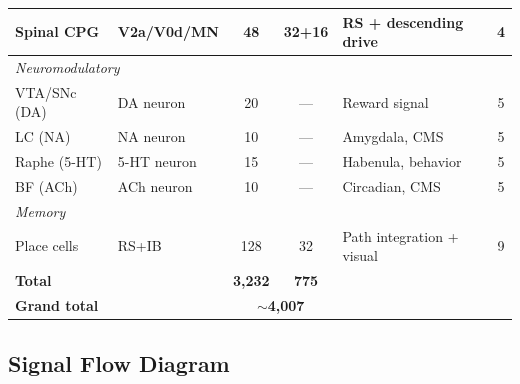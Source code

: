 \documentclass[11pt,a4paper]{article}
\begin{document}
\begin{table}[H]
\begin{tabular}{llcclc}
Spinal CPG      & V2a/V0d/MN  &  48     & 32+16 & RS + descending drive      & 4 \\
\midrule
\multicolumn{6}{l}{\textit{Neuromodulatory}} \\
VTA/SNc (DA)    & DA neuron   &  20     & --- & Reward signal                & 5 \\
LC (NA)         & NA neuron   &  10     & --- & Amygdala, CMS                & 5 \\
Raphe (5-HT)    & 5-HT neuron &  15     & --- & Habenula, behavior           & 5 \\
BF (ACh)        & ACh neuron  &  10     & --- & Circadian, CMS               & 5 \\
\midrule
\multicolumn{6}{l}{\textit{Memory}} \\
Place cells     & RS+IB       & 128     & 32  & Path integration + visual    & 9 \\
\midrule
\textbf{Total} & & \textbf{3,232} & \textbf{775} & & \\
\midrule
\textbf{Grand total} & & \multicolumn{2}{c}{\textbf{$\sim$4,007}} & & \\
\bottomrule
\end{tabular}
\end{table}

\subsection{Signal Flow Diagram}
\end{document}
